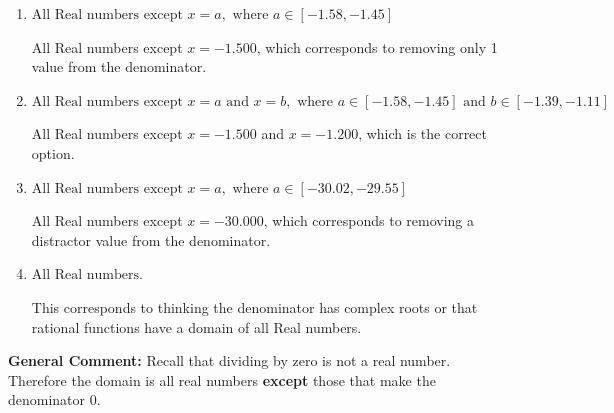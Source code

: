 \documentclass{extbook}[14pt]
\begin{document}
\begin{enumerate}
{\begin{enumerate}[label=\Alph*.]
All Real numbers except $x = -30.000$ and $x = -24.000$, which corresponds to not factoring the denominator correctly.
\item \( \text{All Real numbers except } x = a, \text{ where } a \in [-1.58, -1.45] \)

All Real numbers except $x = -1.500$, which corresponds to removing only 1 value from the denominator.
\item \( \text{All Real numbers except } x = a \text{ and } x = b, \text{ where } a \in [-1.58, -1.45] \text{ and } b \in [-1.39, -1.11] \)

All Real numbers except $x = -1.500$ and $x = -1.200$, which is the correct option.
\item \( \text{All Real numbers except } x = a, \text{ where } a \in [-30.02, -29.55] \)

All Real numbers except $x = -30.000$, which corresponds to removing a distractor value from the denominator.
\item \( \text{All Real numbers.} \)

This corresponds to thinking the denominator has complex roots or that rational functions have a domain of all Real numbers.
\end{enumerate}

\textbf{General Comment:} Recall that dividing by zero is not a real number. Therefore the domain is all real numbers \textbf{except} those that make the denominator 0.
}
\end{enumerate}
\end{document}
